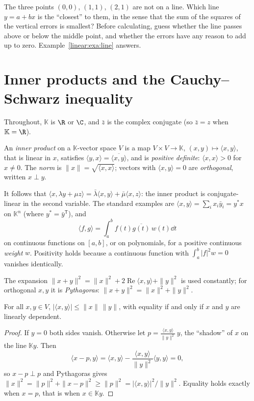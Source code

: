 \begin{think}
The three points $(0,0)$, $(1,1)$, $(2,1)$ are not on a line. Which line $y=a+bx$ is the ``closest'' to them, in the
sense that the sum of the squares of the vertical errors is smallest? Before calculating, guess whether the line passes
above or below the middle point, and whether the errors have any reason to add up to zero. Example~\ref{linear:exa:line} answers.
\end{think}

\section{Inner products and the Cauchy--Schwarz inequality}

Throughout, $\mathbb K$ is $\R$ or $\C$, and $\bar z$ is the complex conjugate (so $\bar z=z$ when $\mathbb K=\R$).

\begin{definition}\label{linear:def:inner}
An \emph{inner product} on a $\mathbb K$-vector space $V$ is a map $V\times V\to\mathbb K$, $(x,y)\mapsto\langle x,y\rangle$,
that is linear in $x$, satisfies $\langle y,x\rangle=\overline{\langle x,y\rangle}$, and is \emph{positive definite}:
$\langle x,x\rangle>0$ for $x\ne0$. The \emph{norm} is $\|x\|=\sqrt{\langle x,x\rangle}$; vectors with $\langle x,y\rangle=0$
are \emph{orthogonal}, written $x\perp y$.
\end{definition}

It follows that $\langle x,\lambda y+\mu z\rangle=\bar\lambda\langle x,y\rangle+\bar\mu\langle x,z\rangle$: the inner
product is conjugate-linear in the second variable. The standard examples are $\langle x,y\rangle=\sum_ix_i\bar y_i=y^*x$
on $\mathbb K^n$ (where $y^*=\bar y^{\mathsf T}$), and
\[
\langle f,g\rangle=\int_a^bf(t)\overline{g(t)}\,w(t)\dd t
\]
on continuous functions on $[a,b]$, or on polynomials, for a positive continuous \emph{weight} $w$. Positivity holds
because a continuous function with $\int_a^b|f|^2w=0$ vanishes identically.

The expansion $\|x+y\|^2=\|x\|^2+2\operatorname{Re}\langle x,y\rangle+\|y\|^2$ is used constantly; for orthogonal $x,y$
it is \emph{Pythagoras}: $\|x+y\|^2=\|x\|^2+\|y\|^2$.

\begin{theorem}\label{linear:thm:cs}
For all $x,y\in V$, $|\langle x,y\rangle|\le\|x\|\,\|y\|$, with equality if and only if $x$ and $y$ are linearly dependent.
\end{theorem}
\begin{proof}
If $y=0$ both sides vanish. Otherwise let $p=\frac{\langle x,y\rangle}{\|y\|^2}\,y$, the ``shadow'' of $x$ on the line
$\mathbb Ky$. Then
\[
\langle x-p,y\rangle=\langle x,y\rangle-\frac{\langle x,y\rangle}{\|y\|^2}\langle y,y\rangle=0,
\]
so $x-p\perp p$ and Pythagoras gives $\|x\|^2=\|p\|^2+\|x-p\|^2\ge\|p\|^2=|\langle x,y\rangle|^2/\|y\|^2$. Equality holds
exactly when $x=p$, that is when $x\in\mathbb Ky$.
\end{proof}


